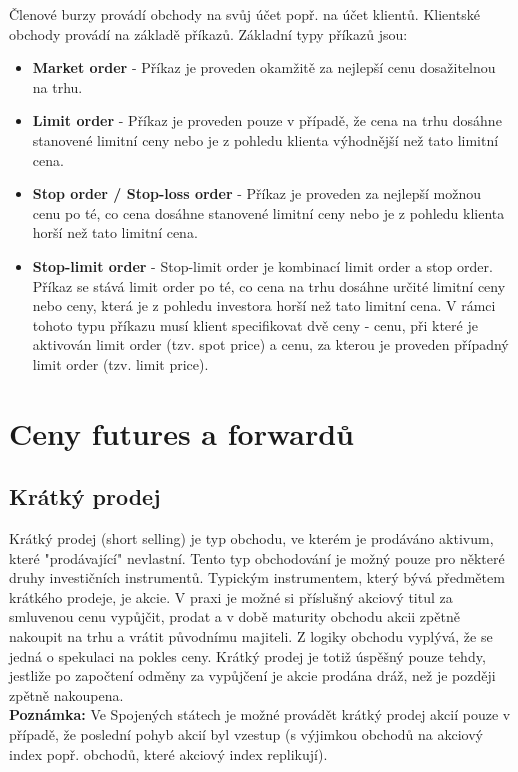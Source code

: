 \documentclass[a4paper]{book}
\begin{document}
Členové burzy provádí obchody na svůj účet popř. na účet klientů. Klientské obchody provádí na základě příkazů. Základní typy příkazů jsou:
\begin{itemize}
\item \textbf{Market order} - Příkaz je proveden okamžitě za nejlepší cenu dosažitelnou na trhu.
\item \textbf{Limit order} - Příkaz je proveden pouze v případě, že cena na trhu dosáhne stanovené limitní ceny nebo je z pohledu klienta výhodnější než tato limitní cena.
\item \textbf{Stop order / Stop-loss order} - Příkaz je proveden za nejlepší možnou cenu po té, co cena dosáhne stanovené limitní ceny nebo je z pohledu klienta horší než tato limitní cena.
\item \textbf{Stop-limit order} - Stop-limit order je kombinací limit order a stop order. Příkaz se stává limit order po té, co cena na trhu dosáhne určité limitní ceny nebo ceny, která je z pohledu investora horší než tato limitní cena. V rámci tohoto typu příkazu musí klient specifikovat dvě ceny - cenu, při které je aktivován limit order (tzv. spot price) a cenu, za kterou je proveden případný limit order (tzv. limit price).
\end{itemize}

\chapter{Ceny futures a forwardů}

\section{Krátký prodej}

Krátký prodej (short selling) je typ obchodu, ve kterém je prodáváno aktivum, které "prodávající" nevlastní. Tento typ obchodování je možný pouze pro některé druhy investičních instrumentů.
Typickým instrumentem, který bývá předmětem krátkého prodeje, je akcie. V praxi je možné si příslušný akciový titul za smluvenou cenu vypůjčit, prodat a v době maturity obchodu akcii zpětně nakoupit na trhu a vrátit původnímu majiteli. Z logiky obchodu vyplývá, že se jedná o spekulaci na pokles ceny. Krátký prodej je totiž úspěšný pouze tehdy, jestliže po započtení odměny za vypůjčení je akcie prodána dráž, než je později zpětně nakoupena.\\

\noindent \textbf{Poznámka:} Ve Spojených státech je možné provádět krátký prodej akcií pouze v případě, že poslední pohyb akcií byl vzestup (s výjimkou obchodů na akciový index popř. obchodů, které akciový index replikují).
\end{document}
